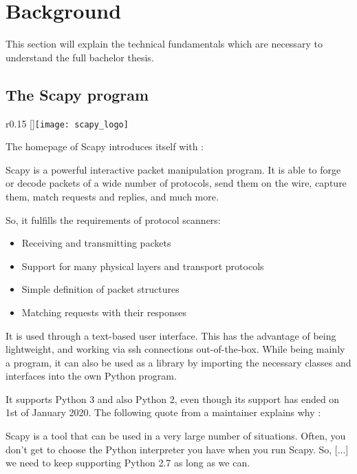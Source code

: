 \chapter{Background}

This section will explain the technical fundamentals which are necessary to understand the full bachelor thesis.

\section{The Scapy program}
\label{sec:scapy}

\begin{wrapfigure}{r}{0.15\textwidth}
    \raisebox{0pt}[\dimexpr{}\baselineskip\relax]{\texttt{[image: scapy\_logo]}}
\end{wrapfigure}

The homepage of Scapy introduces itself with \cite{scapy}:
\begin{displayquote}
Scapy is a powerful interactive packet manipulation program. It is able to forge or decode packets of a wide number of protocols, send them on the wire, capture them, match requests and replies, and much more.
\end{displayquote}

So, it fulfills the requirements of protocol scanners:
\begin{itemize}
    \item Receiving and transmitting packets
    \item Support for many physical layers and transport protocols
    \item Simple definition of packet structures
    \item Matching requests with their responses
\end{itemize} 

It is used through a text-based user interface. This has the advantage of being lightweight, and working via ssh connections out-of-the-box. While being mainly a program, it can also be used as a library by importing the necessary classes and interfaces into the own Python program.

It supports Python 3 and also Python 2, even though its support has ended on 1st of January 2020. The following quote from a maintainer explains why \cite{scapy-py2}:

\begin{displayquote}
    Scapy is a tool that can be used in a very large number of situations. Often, you don't get to choose the Python interpreter you have when you run Scapy. So, [...] we need to keep supporting Python 2.7 as long as we can.
\end{displayquote}


